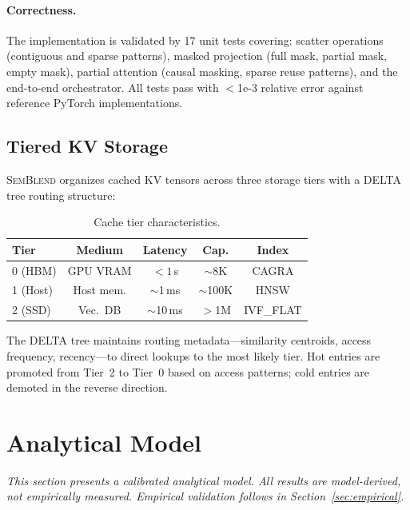 \documentclass[11pt,twocolumn]{article}
\newcommand{\semblend}{\textsc{SemBlend}\xspace}
\begin{document}
\paragraph{Correctness.} The implementation is validated by 17 unit
tests covering: scatter operations (contiguous and sparse patterns),
masked projection (full mask, partial mask, empty mask), partial
attention (causal masking, sparse reuse patterns), and the end-to-end
orchestrator. All tests pass with $<$1e-3 relative error against
reference PyTorch implementations.


\subsection{Tiered KV Storage}
\label{sec:tiers}

\semblend organizes cached KV tensors across three storage tiers with
a DELTA tree routing structure:

\begin{table}[t]
\centering
\caption{Cache tier characteristics.}
\label{tab:tiers}
\footnotesize
\setlength{\tabcolsep}{2.5pt}
\begin{tabular}{@{}lcccc@{}}
\toprule
\textbf{Tier} & \textbf{Medium} & \textbf{Latency} & \textbf{Cap.} & \textbf{Index} \\
\midrule
0 (HBM)  & GPU VRAM & ${<}1$\,\textmu{}s & ${\sim}$8K & CAGRA \\
1 (Host) & Host mem. & ${\sim}$1\,ms & ${\sim}$100K & HNSW \\
2 (SSD)  & Vec.\ DB & ${\sim}$10\,ms & ${>}$1M & IVF\_FLAT \\
\bottomrule
\end{tabular}
\end{table}

The DELTA tree maintains routing metadata---similarity centroids, access
frequency, recency---to direct lookups to the most likely tier. Hot
entries are promoted from Tier~2 to Tier~0 based on access patterns;
cold entries are demoted in the reverse direction.


\section{Analytical Model}
\label{sec:model}

\emph{This section presents a calibrated analytical model. All results
are model-derived, not empirically measured. Empirical validation
follows in Section~\ref{sec:empirical}.}
\end{document}
